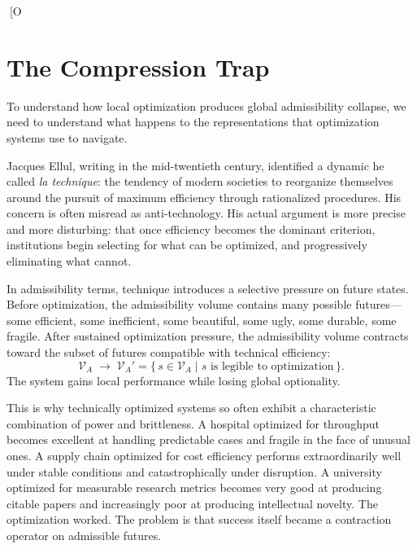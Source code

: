 \documentclass[11pt, letterpaper]{article}
\begin{document}
[O\section{The Compression Trap}

To understand how local optimization produces global admissibility collapse, we need to understand what happens to the representations that optimization systems use to navigate.

Jacques Ellul, writing in the mid-twentieth century, identified a dynamic he called \emph{la technique}: the tendency of modern societies to reorganize themselves around the pursuit of maximum efficiency through rationalized procedures. His concern is often misread as anti-technology. His actual argument is more precise and more disturbing: that once efficiency becomes the dominant criterion, institutions begin selecting for what can be optimized, and progressively eliminating what cannot.

In admissibility terms, technique introduces a selective pressure on future states. Before optimization, the admissibility volume contains many possible futures---some efficient, some inefficient, some beautiful, some ugly, some durable, some fragile. After sustained optimization pressure, the admissibility volume contracts toward the subset of futures compatible with technical efficiency:
\[
  \mathcal{V}_A \;\longrightarrow\; \mathcal{V}_A' = \bigl\{\,s \in \mathcal{V}_A \;\big|\; s \text{ is legible to optimization}\,\bigr\}.
\]
The system gains local performance while losing global optionality.

This is why technically optimized systems so often exhibit a characteristic combination of power and brittleness. A hospital optimized for throughput becomes excellent at handling predictable cases and fragile in the face of unusual ones. A supply chain optimized for cost efficiency performs extraordinarily well under stable conditions and catastrophically under disruption. A university optimized for measurable research metrics becomes very good at producing citable papers and increasingly poor at producing intellectual novelty. The optimization worked. The problem is that success itself became a contraction operator on admissible futures.
\end{document}
